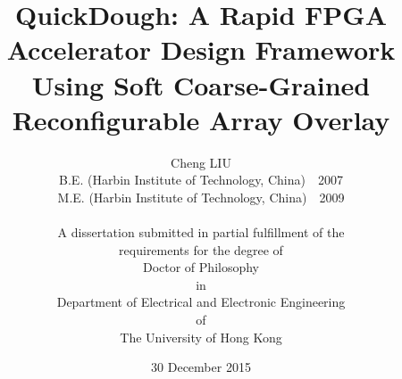 \documentclass[12pt,a4paper]{report}
\begin{document}


\hfill

\title{QuickDough: A Rapid FPGA Accelerator Design 
Framework Using Soft Coarse-Grained Reconfigurable Array Overlay}

\author{Cheng LIU\\
B.E. (Harbin Institute of Technology, China)~~2007\\
M.E. (Harbin Institute of Technology, China)~~2009\\
\\
A dissertation submitted in partial fulfillment of the\\
requirements for the degree of\\
Doctor of Philosophy\\
in\\
Department of Electrical and Electronic Engineering\\
of\\
The University of Hong Kong} 

\date{30 December 2015}
\maketitle



\newpage
\section*{}

\hfill


%
%

\tableofcontents
\cleardoublepage

\listoffigures	%
\listoftables  %









\hfill
\hfill



\end{document}
